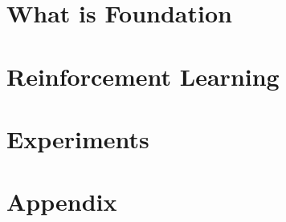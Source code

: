 \documentclass[12pt,a4paper,openright,twoside]{report}
\numberwithin{equation}{section}
\renewcommand{\chaptermark}[1]{\markboth{\thechapter.\ #1}{}}
\begin{document}
\chapter{What is Foundation}




\chapter{Reinforcement Learning}
 




%



\chapter{Experiments}







\renewcommand{\chaptermark}[1]{\markright{\thechapter \ #1}{}}
\lhead[\fancyplain{}{\bfseries\thepage}]{\fancyplain{}{\bfseries\rightmark}}
\appendix   
{}
\chapter*{Appendix}  



\printbibliography
\end{document}
